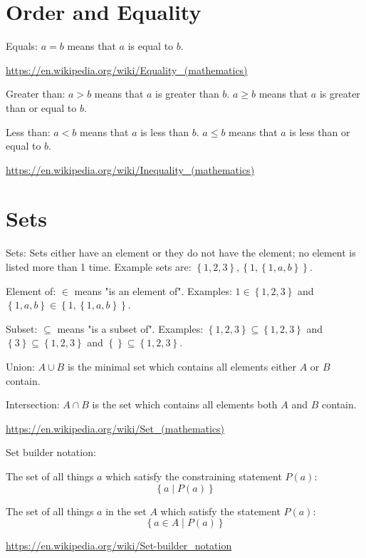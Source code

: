 \documentclass[]{article}
\newcommand{\pqty}[1]{{\left(#1\right)}}
\newcommand{\Bqty}[1]{{\left\{#1\right\}}}
\numberwithin{equation}{section}
\begin{document}
	\section{Order and Equality}
	Equals: \(a=b\) means that \(a\) is equal to \(b\).
	
	\url{https://en.wikipedia.org/wiki/Equality_(mathematics)}
	
	Greater than: \(a>b\) means that \(a\) is greater than \(b\).
	\(a\geq b\) means that \(a\) is greater than or equal to \(b\).
	
	Less than: \(a<b\) means that \(a\) is less than \(b\).
	\(a\leq b\) means that \(a\) is less than or equal to \(b\).
	
	\url{https://en.wikipedia.org/wiki/Inequality_(mathematics)}
	
	\section{Sets}
	Sets: Sets either have an element or they do not have the element; no element is listed more than 1 time. Example sets are: \(\Bqty{1,2,3}, \Bqty{1,\Bqty{1,a,b}}\).
	
	Element of: \(\in\) means "is an element of". Examples: \(1\in\Bqty{1,2,3}\) and \(\Bqty{1,a,b}\in\Bqty{1,\Bqty{1,a,b}}\).
	
	Subset: \(\subseteq\) means "is a subset of". Examples: \(\Bqty{1,2,3}\subseteq\Bqty{1,2,3}\) and \(\Bqty{3}\subseteq\Bqty{1,2,3}\) and \(\Bqty{}\subseteq\Bqty{1,2,3}\).
	
	Union: \(A\cup B\) is the minimal set which contains all elements either \(A\) or \(B\) contain.
	
	Intersection: \(A\cap B\) is the set which contains all elements both \(A\) and \(B\) contain.
	
	\url{https://en.wikipedia.org/wiki/Set_(mathematics)}
	
	Set builder notation:
	
	The set of all things \(a\) which satisfy the constraining statement \(P\pqty{a}\):
	\begin{equation}
	\Bqty{a\mid P\pqty{a}}
	\end{equation}
	
	The set of all things \(a\) in the set \(A\) which satisfy the statement \(P\pqty{a}\):
	\begin{equation}
	\Bqty{a\in A\mid P\pqty{a}}
	\end{equation}
	
	\url{https://en.wikipedia.org/wiki/Set-builder_notation}
	
\end{document}
